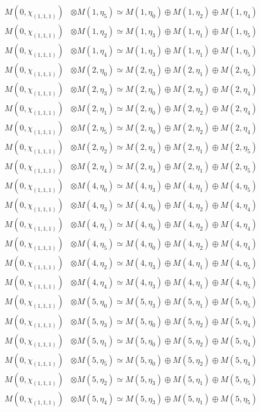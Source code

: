 \begin{align*}
M(0,\chi_{(1,1,1)}) &\otimes M(1,\eta_{5}) \simeq M(1,\eta_{0}) \oplus M(1,\eta_{2}) \oplus M(1,\eta_{4})\\
M(0,\chi_{(1,1,1)}) &\otimes M(1,\eta_{2}) \simeq M(1,\eta_{3}) \oplus M(1,\eta_{1}) \oplus M(1,\eta_{5})\\
M(0,\chi_{(1,1,1)}) &\otimes M(1,\eta_{4}) \simeq M(1,\eta_{3}) \oplus M(1,\eta_{1}) \oplus M(1,\eta_{5})\\
M(0,\chi_{(1,1,1)}) &\otimes M(2,\eta_{0}) \simeq M(2,\eta_{3}) \oplus M(2,\eta_{1}) \oplus M(2,\eta_{5})\\
M(0,\chi_{(1,1,1)}) &\otimes M(2,\eta_{3}) \simeq M(2,\eta_{0}) \oplus M(2,\eta_{2}) \oplus M(2,\eta_{4})\\
M(0,\chi_{(1,1,1)}) &\otimes M(2,\eta_{1}) \simeq M(2,\eta_{0}) \oplus M(2,\eta_{2}) \oplus M(2,\eta_{4})\\
M(0,\chi_{(1,1,1)}) &\otimes M(2,\eta_{5}) \simeq M(2,\eta_{0}) \oplus M(2,\eta_{2}) \oplus M(2,\eta_{4})\\
M(0,\chi_{(1,1,1)}) &\otimes M(2,\eta_{2}) \simeq M(2,\eta_{3}) \oplus M(2,\eta_{1}) \oplus M(2,\eta_{5})\\
M(0,\chi_{(1,1,1)}) &\otimes M(2,\eta_{4}) \simeq M(2,\eta_{3}) \oplus M(2,\eta_{1}) \oplus M(2,\eta_{5})\\
M(0,\chi_{(1,1,1)}) &\otimes M(4,\eta_{0}) \simeq M(4,\eta_{3}) \oplus M(4,\eta_{1}) \oplus M(4,\eta_{5})\\
M(0,\chi_{(1,1,1)}) &\otimes M(4,\eta_{3}) \simeq M(4,\eta_{0}) \oplus M(4,\eta_{2}) \oplus M(4,\eta_{4})\\
M(0,\chi_{(1,1,1)}) &\otimes M(4,\eta_{1}) \simeq M(4,\eta_{0}) \oplus M(4,\eta_{2}) \oplus M(4,\eta_{4})\\
M(0,\chi_{(1,1,1)}) &\otimes M(4,\eta_{5}) \simeq M(4,\eta_{0}) \oplus M(4,\eta_{2}) \oplus M(4,\eta_{4})\\
M(0,\chi_{(1,1,1)}) &\otimes M(4,\eta_{2}) \simeq M(4,\eta_{3}) \oplus M(4,\eta_{1}) \oplus M(4,\eta_{5})\\
M(0,\chi_{(1,1,1)}) &\otimes M(4,\eta_{4}) \simeq M(4,\eta_{3}) \oplus M(4,\eta_{1}) \oplus M(4,\eta_{5})\\
M(0,\chi_{(1,1,1)}) &\otimes M(5,\eta_{0}) \simeq M(5,\eta_{3}) \oplus M(5,\eta_{1}) \oplus M(5,\eta_{5})\\
M(0,\chi_{(1,1,1)}) &\otimes M(5,\eta_{3}) \simeq M(5,\eta_{0}) \oplus M(5,\eta_{2}) \oplus M(5,\eta_{4})\\
M(0,\chi_{(1,1,1)}) &\otimes M(5,\eta_{1}) \simeq M(5,\eta_{0}) \oplus M(5,\eta_{2}) \oplus M(5,\eta_{4})\\
M(0,\chi_{(1,1,1)}) &\otimes M(5,\eta_{5}) \simeq M(5,\eta_{0}) \oplus M(5,\eta_{2}) \oplus M(5,\eta_{4})\\
M(0,\chi_{(1,1,1)}) &\otimes M(5,\eta_{2}) \simeq M(5,\eta_{3}) \oplus M(5,\eta_{1}) \oplus M(5,\eta_{5})\\
M(0,\chi_{(1,1,1)}) &\otimes M(5,\eta_{4}) \simeq M(5,\eta_{3}) \oplus M(5,\eta_{1}) \oplus M(5,\eta_{5})\\
\end{align*}


